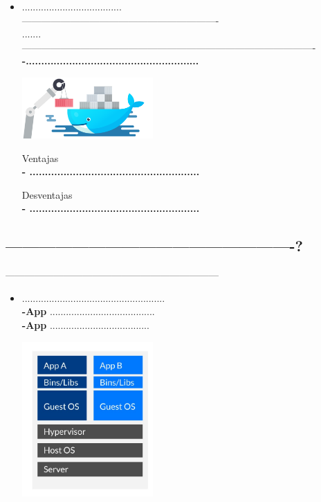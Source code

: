 \documentclass[twoside,twocolumn]{article}
\begin{document}
\begin{itemize}
\item .....................................
\\ -------------------------------------------------------------
\\.......
\\-------------------------------------------------------------------------------------------
\\ \textbf{-........................................................}


\begin{center}
	\includegraphics[width=5cm]{./Imagenes/docker} 
	\end{center}

Ventajas
\\ \textbf{- .......................................................}
 

Desventajas
\\ \textbf{- .......................................................}
\end{itemize} 

\subsection{----------------------------------------------------?}
------------------------------------------------------------------

\begin{itemize}
	\item .....................................................
	\\ \textbf{-App} .......................................
	\\ \textbf{-App} .....................................
	\begin{center}
	\includegraphics[width=5cm]{./Imagenes/jerarquia1} 
	\end{center}
\end{itemize} 
\end{document}
